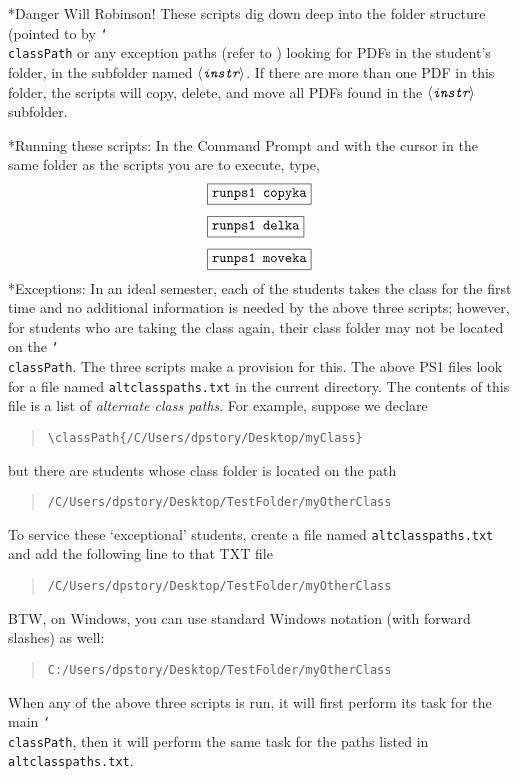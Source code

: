 \documentclass{article}
\makeatletter
\def\cs#1{\texttt{\char`\\#1}}
\let\app\textsf
\let\uif\textsf
\def\ameta#1{\ensuremath{\langle\textit{\texttt{#1}}\rangle}}
\renewcommand{\paragraph}
    {\@startsection{paragraph}{4}{0pt}{6pt}{-3pt}{\bfseries}}
\def\chnglabelname#1{\edef\@currentlabelname{#1}}
\makeatother
\begin{document}
\paragraph*{\color{red}Danger Will Robinson!} These scripts dig
down deep into the folder structure (pointed to by \cs{classPath}
or any exception paths (refer to ) looking for PDFs in the student's folder, in
the subfolder named \ameta{instr}. If there are more than one
PDF in this folder, the scripts will copy, delete, and move all
PDFs found in the \ameta{instr} subfolder.

\paragraph*{Running these scripts:}  In the \uif{Command Prompt} and with the cursor in the same folder
as the scripts you are to execute, type,
\begin{align*}
    &\fbox{\ttfamily runps1 copyka}\\[1ex]
    &\fbox{\ttfamily runps1 delka}\\[1ex]
    &\fbox{\ttfamily runps1 moveka}
\end{align*}
\paragraph*{Exceptions:}\chnglabelname{Exceptions}\label{para:exceptions} In an ideal semester, each of the students
takes the class for the first time and no additional information
is needed by the above three scripts; however, for students who
are taking the class again, their class folder may not be
located on the \cs{classPath}. The three scripts make a
provision for this. The above PS1 files look for a file named
\texttt{altclasspaths.txt} in the current directory. The
contents of this file is a list of \emph{alternate class paths}. For example, suppose
we declare
\begin{quote}
\verb|\classPath{/C/Users/dpstory/Desktop/myClass}|
\end{quote}
but there are students whose class folder is located on the path
\begin{quote}
\verb|/C/Users/dpstory/Desktop/TestFolder/myOtherClass|
\end{quote}
To service these `exceptional' students, create a file named
\texttt{altclasspaths.txt} and add the following line to that TXT file
\begin{quote}
\verb|/C/Users/dpstory/Desktop/TestFolder/myOtherClass|
\end{quote}
BTW, on \app{Windows}, you can use standard \app{Windows} notation (with forward slashes) as well:
\begin{quote}
\verb|C:/Users/dpstory/Desktop/TestFolder/myOtherClass|
\end{quote}
When any of the above three scripts is run, it will first perform its task for the main
\cs{classPath}, then it will perform the same task for the paths listed in
\texttt{altclasspaths.txt}.
\end{document}
